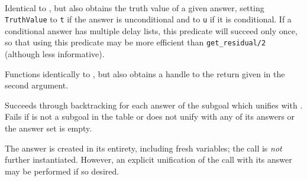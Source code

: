 \begin{description}
\begin{minipage}{6in}
\end{minipage} \\


%
Identical to , but also obtains the truth value
of a given answer, setting {\tt TruthValue} to {\tt t} if the answer
is unconditional and to {\tt u} if it is conditional.  If a
conditional answer has multiple delay lists, this predicate will
succeed only once, so that using this predicate may be more efficient
than {\tt get\_residual/2} (although less informative).


%
Functions identically to , but also obtains a
handle to the return given in the second argument.


%
Succeeds through backtracking for each answer of the subgoal
 which unifies with .  Fails if
 is not a subgoal in the table or 
does not unify with any of its answers or the answer set is empty.

The answer is created in its entirety, including fresh variables; the
call is \emph{not} further instantiated.  However, an explicit
unification of the call with its answer may be performed if so
desired.



\end{description}
